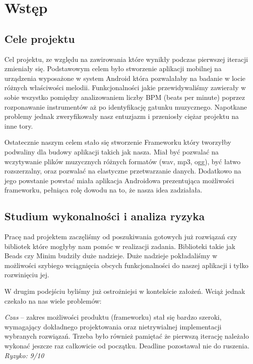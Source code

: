 
\newcommand{\Header}[1]
{\vspace*{4pt}\noindent\textbf{#1}\vspace*{2pt}\par}

\chapter{Wstęp}
\section{Cele projektu}
Cel projektu, ze względu na zawirowania które wynikły podczas pierwszej iteracji zmieniały się.
Podstawowym celem było stworzenie aplikacji mobilnej na urządzenia wyposażone w system Android która
pozwalałaby na badanie w locie różnych właściwości melodii. Funkcjonalności jakie przewidywaliśmy zawierały w sobie wszystko pomiędzy analizowaniem liczby BPM (beats per minute) poprzez rozponawanie instrumentów aż po identyfikację gatunku muzycznego. Napotkane problemy jednak zweryfikowały nasz entuzjazm i przeniosły ciężar projektu na inne tory.

Ostatecznie naszym celem stało się stworzenie Frameworku który tworzyłby podwaliny dla budowy aplikacji takich jak nasza. Miał być pozwalać na wczytywanie plików muzycznych różnych formatów (wav, mp3, ogg), być łatwo rozszerzalny, oraz pozwalać na elastyczne przetwarzanie danych. Dodatkowo na jego powstanie powstać miała aplikacja Androidowa prezentująca możliwości frameworku, pełniąca rolę dowodu na to, że nasza idea zadziałała.
   
\section{Studium wykonalności i analiza ryzyka}
Pracę nad projektem zaczęliśmy od poszukiwania gotowych już rozwiązań czy bibliotek które mogłyby nam pomóc w realizacji zadania. Biblioteki takie jak Beads \cite{Beads} czy Minim \cite{Minim} budziły duże nadzieje. Duże nadzieje pokładaliśmy w możliwości szybiego wciągnięcia obcych funkcjonalności do naszej aplikacji i tylko rozwinięciu jej.

W drugim podejściu byliśmy już ostrożniejsi w kontekście założeń. Wciąż jednak czekało na nas wiele problemów:

\noindent\emph{Czas} -- zakres możliwości produktu (frameworku) stał się bardzo szeroki, wymagający dokładnego projektowania oraz nietrywialnej implementacji wybranych rozwiązań. Trzeba było również pamiętać że pierwszą iterację należało wykonać jeszcze raz całkowicie od początku. Deadline pozostawał nie do ruszenia. \emph{Ryzyko: 9/10}

